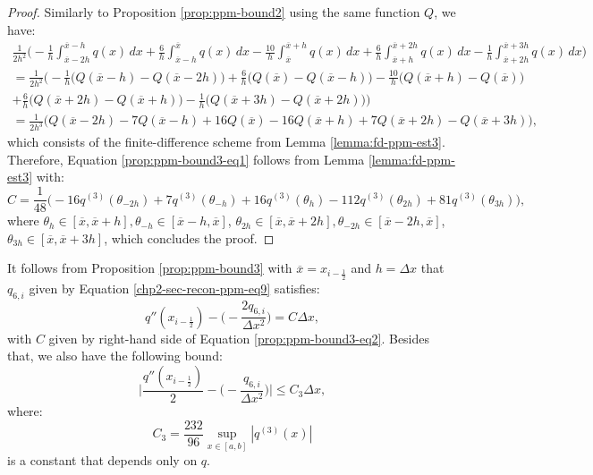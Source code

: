 \begin{proof}
	Similarly to Proposition \ref{prop:ppm-bound2} using the same function $Q$, we have:
	\begin{align*}
	\frac{1}{2h^2}
		\bigg(-\frac{1}{h} \int_{\overline{x}-2h}^{\overline{x}-h} q(x) \,dx 
		      +\frac{6}{h}\int_{\overline{x}-h}^{\overline{x}} q(x) \,dx   
		      -\frac{10}{h}\int_{\overline{x}}^{\overline{x}+h} q(x) \,dx  
		      +\frac{6}{h} \int_{\overline{x}+h}^{\overline{x}+2h} q(x) \,dx   
		      -\frac{1}{h} \int_{\overline{x}+2h}^{\overline{x}+3h} q(x) \,dx   
		\bigg)\\ 
		= \frac{1}{2h^2} \bigg(
		-\frac{1}{h}   \big( Q(\overline{x}-h)- Q(\overline{x}-2h)\big) 
		+\frac{6}{h} \big( Q(\overline{x}) - Q(\overline{x}-h) \big) 
		-\frac{10}{h} \big( Q(\overline{x}+h) - Q(\overline{x})  \big) \\
		+\frac{6}{h}  \big( Q(\overline{x}+2h) - Q(\overline{x}+h)  \big) 
		-\frac{1}{h}  \big( Q(\overline{x}+3h) - Q(\overline{x}+2h)  \big) 
		\bigg)\\
		= \frac{1}{2h^3}\bigg(Q(\overline{x}-2h) - 7Q(\overline{x}-h) + 16Q(\overline{x}) 
		-16Q(\overline{x}+h) +7Q(\overline{x}+2h) - Q(\overline{x}+3h)  \bigg),
	\end{align*}
	which consists of the finite-difference scheme from Lemma \ref{lemma:fd-ppm-est3}. 
	Therefore, Equation \eqref{prop:ppm-bound3-eq1} follows from 
	Lemma \ref{lemma:fd-ppm-est3} with:
	\begin{equation}
		\label{prop:ppm-bound3-eq2}
		C = \frac{1}{48}\bigg(-16q^{(3)}(\theta_{-2h}) + 7q^{(3)}(\theta_{-h}) +16q^{(3)}(\theta_{h}) - 112q^{(3)}(\theta_{2h}) + 81q^{(3)}(\theta_{3h})\bigg), 
	\end{equation}
	where $\theta_{h} \in [\overline{x},\overline{x}+h], \theta_{-h}\in [\overline{x}-h,\overline{x}]$, 
	$\theta_{2h} \in [\overline{x},\overline{x}+2h], \theta_{-2h}\in [\overline{x}-2h,\overline{x}]$,
	$\theta_{3h} \in [\overline{x},\overline{x}+3h]$,
	which concludes the proof.
\end{proof}

\begin{corollary}
	\label{prop:ppm-bound3-corollary}
	It follows from Proposition \ref{prop:ppm-bound3} with 
	$\overline{x} = x_{i-\frac{1}{2}}$ and $h = \Delta x$
	that $q_{6,i}$ given by Equation \eqref{chp2-sec-recon-ppm-eq9} satisfies:
	\begin{equation}
	q''(x_{i-\frac{1}{2}}) -\bigg(-\frac{2q_{6, i}}{\Delta x^2}\bigg) = C\Delta x,
	\end{equation}
	with $C$ given by right-hand side of Equation \eqref{prop:ppm-bound3-eq2}.
	Besides that, we also have the following bound:
	\begin{equation}
		\label{ppm-edges-bound3}
		\bigg|\frac{q''(x_{i-\frac{1}{2}})}{2} -\bigg(-\frac{q_{6, i}}{\Delta x^2}\bigg) \bigg|
		\leq C_3\Delta x,
	\end{equation}
	where:
	\begin{equation}
		\label{ppm-cte-bound3}
		C_3 = \frac{232}{96}\sup_{x \in [a,b]}{|q^{(3)}(x)|} 
	\end{equation}
	is a constant that depends only on $q$.
\end{corollary}

